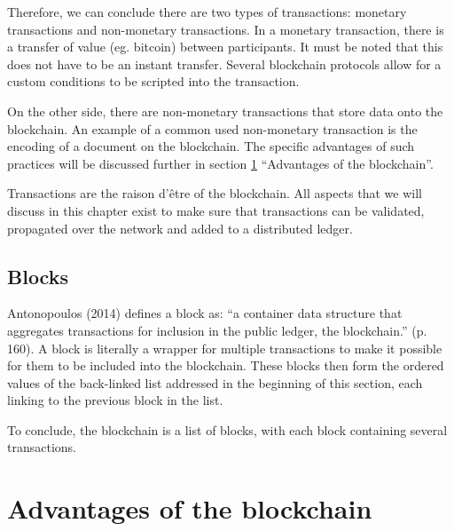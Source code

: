 Therefore, we can conclude there are two types of transactions: monetary transactions and non-monetary transactions. In a monetary transaction, there is a transfer of value (eg. bitcoin) between participants. It must be noted that this does not have to be an instant transfer. Several blockchain protocols allow for a custom conditions to be scripted into the transaction.

On the other side, there are non-monetary transactions that store data onto the blockchain. An example of a common used non-monetary transaction is the encoding of a document on the blockchain. The specific advantages of such practices will be discussed further in section \ref{sec:Advantages of the blockchain} ``Advantages of the blockchain''.

Transactions are the raison d'\^{e}tre of the blockchain. All aspects that we will discuss in this chapter exist to make sure that transactions can be validated, propagated over the network and added to a distributed ledger.

\subsection{Blocks}
\label{subsec:Blocks}

Antonopoulos (2014) \cite{antonopoulos:2014} defines a block as: ``a container data structure that aggregates transactions for inclusion in the public ledger, the blockchain.'' (p. 160). A block is literally a wrapper for multiple transactions to make it possible for them to be included into the blockchain. These blocks then form the ordered values of the back-linked list addressed in the beginning of this section, each linking to the previous block in the list.

To conclude, the blockchain is a list of blocks, with each block containing several transactions.

\newpage
\section{Advantages of the blockchain}
\label{sec:Advantages of the blockchain}
